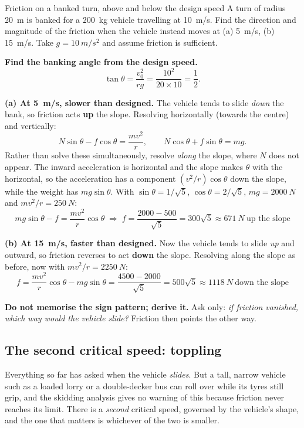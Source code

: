 \begin{exbox}{Friction on a banked turn, above and below the design speed}
A turn of radius \SI{20}{m} is banked for a \SI{200}{kg} vehicle travelling at \SI{10}{m/s}. Find the
direction and magnitude of the friction when the vehicle instead moves at (a) \SI{5}{m/s},
(b) \SI{15}{m/s}. Take $g=\SI{10}{m/s^2}$ and assume friction is sufficient.

 \textbf{Find the banking angle from the design speed.}
\[
\tan\theta=\frac{v_0^{2}}{rg}=\frac{10^{2}}{20\times10}=\frac12.
\]

 \textbf{(a) At \SI{5}{m/s}, slower than designed.} The vehicle tends to slide \emph{down}
the bank, so friction acts \textbf{up} the slope. Resolving horizontally (towards the centre) and
vertically:
\[
N\sin\theta-f\cos\theta=\frac{mv^{2}}{r},
\qquad
N\cos\theta+f\sin\theta=mg.
\]
Rather than solve these simultaneously, resolve \emph{along} the slope, where $N$ does not appear.
The inward acceleration is horizontal and the slope makes $\theta$ with the horizontal, so the
acceleration has a component $(v^{2}/r)\cos\theta$ down the slope, while the weight has $mg\sin\theta$. With
$\sin\theta=1/\sqrt5$, $\cos\theta=2/\sqrt5$, $mg=\SI{2000}{N}$ and $mv^{2}/r=\SI{250}{N}$:
\[
mg\sin\theta-f=\frac{mv^{2}}{r}\cos\theta
\;\Longrightarrow\;
f=\frac{2000-500}{\sqrt5}=\boxed{300\sqrt5\approx\SI{671}{N}\ \text{up the slope}}
\]

 \textbf{(b) At \SI{15}{m/s}, faster than designed.} Now the vehicle tends to slide
\emph{up} and outward, so friction reverses to act \textbf{down} the slope. Resolving along the slope
as before, now with $mv^{2}/r=\SI{2250}{N}$:
\[
f=\frac{mv^{2}}{r}\cos\theta-mg\sin\theta=\frac{4500-2000}{\sqrt5}
=\boxed{500\sqrt5\approx\SI{1118}{N}\ \text{down the slope}}
\]

\smallskip
\textbf{Do not memorise the sign pattern; derive it.} Ask only: \emph{if friction vanished, which way
would the vehicle slide?} Friction then points the other way.
\end{exbox}

\subsection{The second critical speed: toppling}
Everything so far has asked when the vehicle \emph{slides}. But a tall, narrow vehicle such as a loaded
lorry or a double-decker bus can roll over while its tyres still grip, and the skidding analysis gives
no warning of this because friction never reaches its limit. There is a \emph{second} critical speed,
governed by the vehicle's shape, and the one that matters is whichever of the two is smaller.

